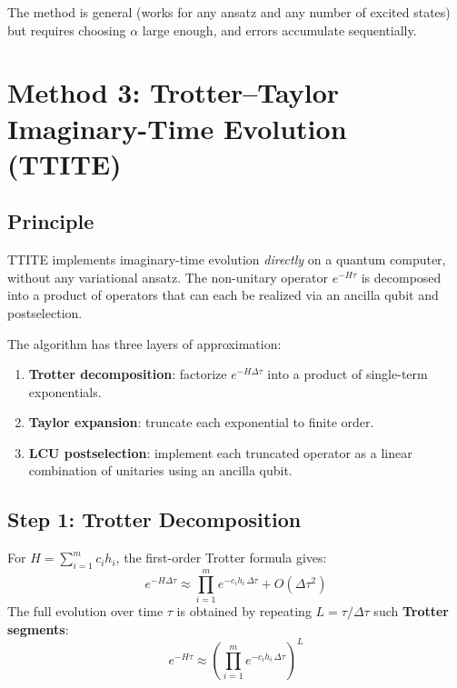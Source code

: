 \documentclass[11pt,a4paper]{article}
\begin{document}
The method is general (works for any ansatz and any number of excited states)
but requires choosing $\alpha$ large enough, and errors accumulate
sequentially.


\section{Method 3: Trotter--Taylor Imaginary-Time Evolution (TTITE)}
\label{sec:ttite}

\subsection{Principle}

TTITE implements imaginary-time evolution \emph{directly} on a quantum
computer, without any variational ansatz.  The non-unitary operator
$e^{-H\tau}$ is decomposed into a product of operators that can each
be realized via an ancilla qubit and postselection.

The algorithm has three layers of approximation:
\begin{enumerate}[nosep]
  \item \textbf{Trotter decomposition}: factorize $e^{-H\Delta\tau}$ into
    a product of single-term exponentials.
  \item \textbf{Taylor expansion}: truncate each exponential to finite order.
  \item \textbf{LCU postselection}: implement each truncated operator as a
    linear combination of unitaries using an ancilla qubit.
\end{enumerate}

\subsection{Step 1: Trotter Decomposition}

For $H = \sum_{i=1}^m c_i h_i$, the first-order Trotter formula gives:
\begin{equation}
  e^{-H\Delta\tau}
  \approx \prod_{i=1}^{m} e^{-c_i h_i\,\Delta\tau}
  + O(\Delta\tau^2)
  \label{eq:trotter}
\end{equation}
The full evolution over time $\tau$ is obtained by repeating $L = \tau/\Delta\tau$ such \textbf{Trotter segments}:
\begin{equation}
  e^{-H\tau} \approx \left(\prod_{i=1}^{m} e^{-c_i h_i\,\Delta\tau}\right)^L
\end{equation}
\end{document}
